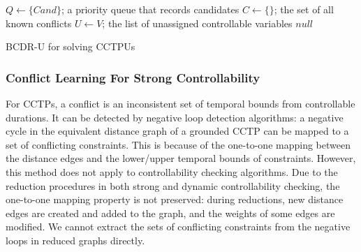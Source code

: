 \documentclass[jair,twoside,11pt,theapa]{article}
\begin{document}
\begin{algorithm}[htb!]
	\SetAlgoLined
	\Indm
	\Initialize{}
	\;
	{$Q\leftarrow\{\mathit{Cand}\}$; a priority queue that records candidates}\;
	{$C\leftarrow\{\}$; the set of all known conflicts}\;
	{$U\leftarrow V$; the list of unassigned controllable variables}\;
	\Indm
	\Algorithm{}
	\Indp
\Return $null$\;
\caption{BCDR-U for solving CCTPUs}
\label{alg:bcdr_controllability}
\end{algorithm}


\subsubsection{Conflict Learning For Strong Controllability}


For CCTPs, a conflict is an inconsistent set of temporal bounds from controllable durations. It can
be detected by negative loop detection algorithms: a negative cycle in the
equivalent distance graph of a grounded CCTP can be mapped to a set of
conflicting constraints. This is because of the one-to-one mapping between the
distance edges and the lower/upper temporal bounds of constraints. However, this
method does not apply to controllability checking algorithms. Due to the
reduction procedures in both strong and dynamic controllability checking, the one-to-one mapping property is not preserved: during reductions,
new distance edges are created and added to the graph, and the weights of some
edges are modified. We cannot extract the sets of conflicting constraints from
the negative loops in reduced graphs directly.
\end{document}
